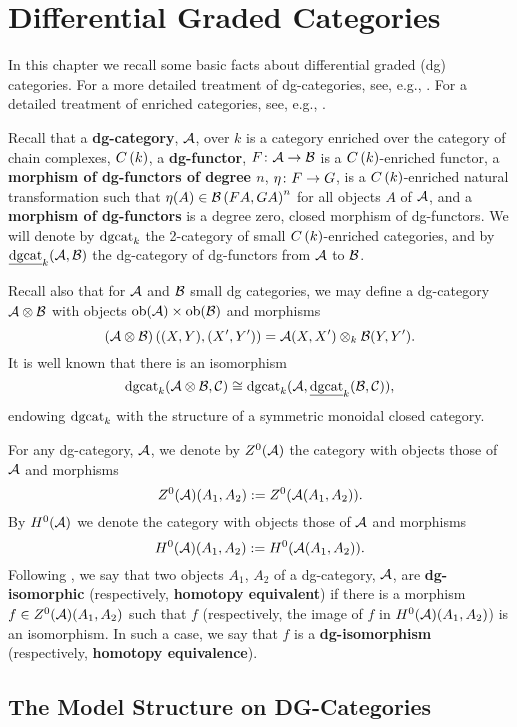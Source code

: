 \chapter{Differential Graded Categories}\label{section: background on dgcats}
In this chapter we recall some basic facts about differential graded (dg) categories.
For a more detailed treatment of dg-categories, see, e.g., \textcite{Keller95,Keller06,Drinfeld04}.
For a detailed treatment of enriched categories, see, e.g., \textcite[Chapter 6]{BorceuxVol2}.

Recall that a \textbf{dg-category}, \(\mathcal{A}\), over \(k\) is a category enriched over the category of chain complexes, \(C\left(k\right)\), a \textbf{dg-functor}, \(F \colon \mathcal{A} \rightarrow \mathcal{B}\) is a \(C\left(k\right)\)-enriched functor, a \textbf{morphism of dg-functors of degree \(n\)}, \(\eta \colon F \rightarrow G\), is a \(C\left(k\right)\)-enriched natural transformation such that \(\eta(A) \in \mathcal{B}\left(FA, GA\right)^n\) for all objects \(A\) of \(\mathcal {\mathcal{A}}\), and a \textbf{morphism of dg-functors} is a degree zero, closed morphism of dg-functors.
We will denote by \(\operatorname{dgcat}_k\) the 2-category of small \(C\left(k\right)\)-enriched categories, and by \(\underline{\operatorname{dgcat}}_{k}(\mathcal{A},\mathcal{B})\) the dg-category of dg-functors from \(\mathcal{A}\) to \(\mathcal{B}\).

Recall also that for \(\mathcal{A}\) and \(\mathcal{B}\) small dg categories, we may define a dg-category \(\mathcal{A} \otimes \mathcal{B}\) with objects \(\operatorname{ob}(\mathcal{A}) \times \operatorname{ob}(\mathcal{B})\) and morphisms
\[(\mathcal{A} \otimes \mathcal{B})\left((X,Y), (X^\prime,Y^\prime)\right) = \mathcal{A}(X,X^\prime) \otimes_k \mathcal{B}(Y, Y^\prime).\]
It is well known that there is an isomorphism
\[\operatorname{dgcat}_k(\mathcal{A} \otimes \mathcal{B}, \mathcal{C}) \cong \operatorname{dgcat}_k(\mathcal{A}, \underline{\operatorname{dgcat}}_{k}(\mathcal{B}, \mathcal{C})),\]
endowing \(\operatorname{dgcat}_k\) with the structure of a symmetric monoidal closed category.

For any dg-category, \(\mathcal{A}\), we denote by \(Z^0(\mathcal{A})\) the category with objects those of \(\mathcal{A}\) and morphisms
\[Z^0(\mathcal{A})(A_1, A_2) := Z^0(\mathcal{A}(A_1,A_2)).\]
By \(H^0(\mathcal{A})\) we denote the category with objects those of \(\mathcal{A}\) and morphisms
\[H^0(\mathcal{A})(A_1, A_2) := H^0(\mathcal{A}(A_1,A_2)).\]
Following \textcite{CS15}, we say that two objects \(A_1\), \(A_2\) of a dg-category, \(\mathcal{A}\), are \textbf{dg-isomorphic} (respectively, \textbf{homotopy equivalent}) if there is a morphism \(f \in Z^0(\mathcal{A})(A_1, A_2)\) such that \(f\) (respectively, the image of \(f\) in \(H^0(\mathcal{A})(A_1, A_2)\)) is an isomorphism.
In such a case, we say that \(f\) is a \textbf{dg-isomorphism} (respectively, \textbf{homotopy equivalence}).

\section{The Model Structure on DG-Categories}


